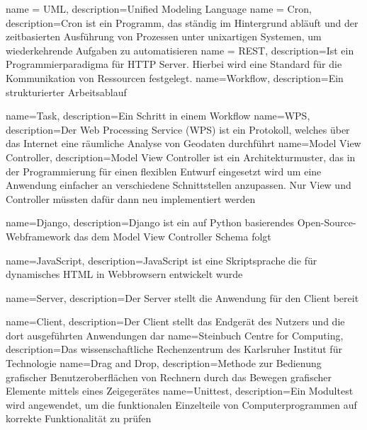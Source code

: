 %
%

{ 
    name = UML, 
    description={Unified Modeling Language}
}
{
    name = Cron,
    description={Cron ist ein Programm, das ständig im Hintergrund abläuft und der zeitbasierten Ausführung von Prozessen unter unixartigen Systemen, um wiederkehrende Aufgaben zu automatisieren}
}
{
    name = REST,
    description={Ist ein Programmierparadigma für HTTP Server. Hierbei wird eine Standard für die Kommunikation von Ressourcen festgelegt.}
}
{
    name=Workflow,
    description={Ein strukturierter Arbeitsablauf}
}

{
    name=Task,
    description={Ein Schritt in einem Workflow}
}
{
    name=WPS,
    description={Der Web Processing Service (WPS) ist ein Protokoll, welches über das Internet eine räumliche Analyse von Geodaten durchführt}
}
{
    name=Model View Controller,
    description={Model View Controller ist ein Architekturmuster, das in der Programmierung für einen flexiblen Entwurf eingesetzt wird um eine Anwendung einfacher an verschiedene Schnittstellen anzupassen. Nur View und Controller müssten dafür dann neu implementiert werden}
}

{
    name=Django,
    description={Django ist ein auf Python basierendes Open-Source-Webframework das dem \Gls{Model View Controller} Schema folgt}
}

{
    name=JavaScript,
    description={JavaScript ist eine Skriptsprache die für dynamisches HTML in Webbrowsern entwickelt wurde}
}

{
    name=Server,
    description={Der Server stellt die Anwendung für den Client bereit}
}

{
    name=Client,
    description={Der Client stellt das Endgerät des Nutzers und die dort ausgeführten Anwendungen dar}
}
{
    name=Steinbuch Centre for Computing,
    description={Das wissenschaftliche Rechenzentrum des Karlsruher Institut für Technologie}
}
{
    name=Drag and Drop,
    description={Methode zur Bedienung grafischer Benutzeroberflächen von Rechnern durch das Bewegen grafischer Elemente mittels eines Zeigegerätes}
}
{
    name=Unittest,
    description={Ein Modultest wird angewendet, um die funktionalen Einzelteile von Computerprogrammen auf korrekte Funktionalität zu prüfen}
}

